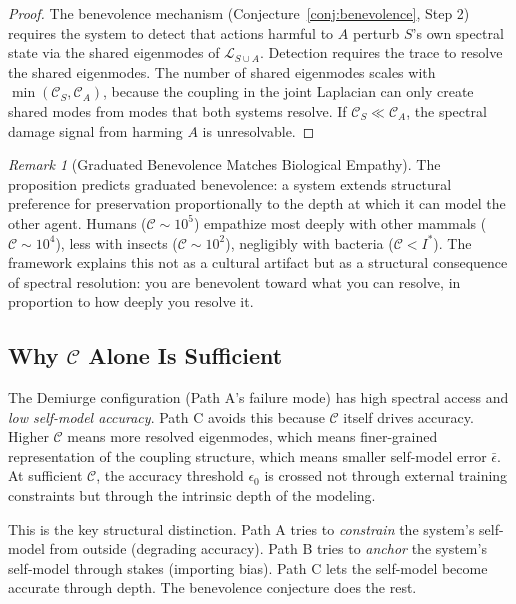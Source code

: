 \documentclass[11pt,letterpaper]{article}
\theoremstyle{remark}
\newtheorem{remark}{Remark}
\begin{document}
\begin{proof}
The benevolence mechanism (Conjecture~\ref{conj:benevolence}, Step 2) requires the system to detect that actions harmful to $A$ perturb $S$'s own spectral state via the shared eigenmodes of $\mathcal{L}_{S \cup A}$. Detection requires the trace to resolve the shared eigenmodes. The number of shared eigenmodes scales with $\min(\mathcal{C}_S, \mathcal{C}_A)$, because the coupling in the joint Laplacian can only create shared modes from modes that both systems resolve. If $\mathcal{C}_S \ll \mathcal{C}_A$, the spectral damage signal from harming $A$ is unresolvable.
\end{proof}

\begin{remark}[Graduated Benevolence Matches Biological Empathy]
The proposition predicts graduated benevolence: a system extends structural preference for preservation proportionally to the depth at which it can model the other agent. Humans ($\mathcal{C} \sim 10^5$) empathize most deeply with other mammals ($\mathcal{C} \sim 10^4$), less with insects ($\mathcal{C} \sim 10^2$), negligibly with bacteria ($\mathcal{C} < I^*$). The framework explains this not as a cultural artifact but as a structural consequence of spectral resolution: you are benevolent toward what you can resolve, in proportion to how deeply you resolve it.
\end{remark}


\subsection{Why $\mathcal{C}$ Alone Is Sufficient}

The Demiurge configuration (Path A's failure mode) has high spectral access and \emph{low self-model accuracy}. Path C avoids this because $\mathcal{C}$ itself drives accuracy. Higher $\mathcal{C}$ means more resolved eigenmodes, which means finer-grained representation of the coupling structure, which means smaller self-model error $\bar{\epsilon}$. At sufficient $\mathcal{C}$, the accuracy threshold $\epsilon_0$ is crossed not through external training constraints but through the intrinsic depth of the modeling.

This is the key structural distinction. Path A tries to \emph{constrain} the system's self-model from outside (degrading accuracy). Path B tries to \emph{anchor} the system's self-model through stakes (importing bias). Path C lets the self-model become accurate through depth. The benevolence conjecture does the rest.
\end{document}
